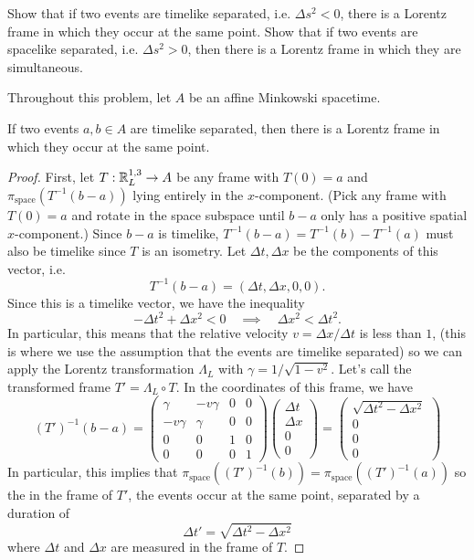 \documentclass{../../templates/lkx_pset}
\begin{document}
\begin{problem}{6}
Show that if two events are timelike separated, i.e. $\Delta s^2 < 0$, there is a Lorentz frame in which they occur at the same point. Show that if two events are spacelike separated, i.e. $\Delta s^2 > 0$, then there is a Lorentz frame in which they are simultaneous.
\end{problem}

\begin{parts}
	Throughout this problem, let $A$ be an affine Minkowski spacetime.
	\begin{claim}{1}
		If two events $a,b\in A$ are timelike separated, then there is a Lorentz frame in which they occur at the same point.
	\end{claim}
	\begin{proof}
		First, let $T : \mathbb{R}^{1,3}_L \to A$ be any frame with $T(0) = a$ and $\pi_{\textrm{space}}(T^{-1}(b-a))$ lying entirely in the $x$-component. (Pick any frame with $T(0)=a$ and rotate in the space subspace until $b-a$ only has a positive spatial $x$-component.) Since $b-a$ is timelike, $T^{-1}(b-a)=T^{-1}(b)-T^{-1}(a)$ must also be timelike since $T$ is an isometry. Let $\Delta t, \Delta x$ be the components of this vector, i.e.
		\[
			T^{-1}(b-a) = (\Delta t, \Delta x, 0, 0).
		\]
		Since this is a timelike vector, we have the inequality
		\[
			-\Delta t^2 + \Delta x^2 < 0 \quad\implies\quad \Delta x^2 < \Delta t^2.
		\]
		In particular, this means that the relative velocity $v= \Delta x / \Delta t$ is less than $1$, (this is where we use the assumption that the events are timelike separated) so we can apply the Lorentz transformation $\Lambda_L$ with $\gamma = 1/\sqrt{1-v^2}$. Let's call the transformed frame $T' = \Lambda_L \circ T$. In the coordinates of this frame, we have
		\[
			(T')^{-1}(b-a) =
			\begin{pmatrix}
				\gamma   & -v\gamma & 0 & 0 \\
				-v\gamma & \gamma   & 0 & 0 \\
				0        & 0        & 1 & 0 \\
				0        & 0        & 0 & 1
			\end{pmatrix}\begin{pmatrix}\Delta t\\\Delta x\\0\\0\end{pmatrix}
			=\begin{pmatrix}\sqrt{\Delta t^2 - \Delta x^2}\\ 0\\0\\0\end{pmatrix}
		\]
		In particular, this implies that $\pi_{\textrm{space}}((T')^{-1}(b)) = \pi_{\textrm{space}}((T')^{-1}(a))$ so the in the frame of $T'$, the events occur at the same point, separated by a duration of
		\[\Delta t' = \sqrt{\Delta t^2 - \Delta x^2}\]
		where $\Delta t$ and $\Delta x$ are measured in the frame of $T$.
	\end{proof}


\end{parts}
\end{document}
